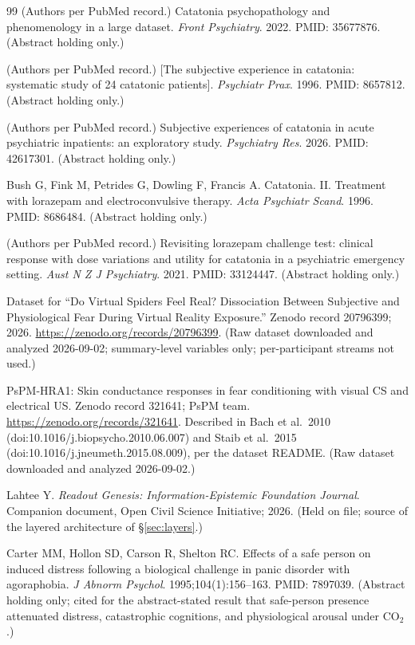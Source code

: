 \documentclass[9pt,twocolumn]{article}
\begin{document}
\begin{thebibliography}{99}
(Authors per PubMed record.) Catatonia psychopathology and phenomenology in a large dataset. \emph{Front Psychiatry}. 2022. PMID: 35677876. (Abstract holding only.)

(Authors per PubMed record.) [The subjective experience in catatonia: systematic study of 24 catatonic patients]. \emph{Psychiatr Prax}. 1996. PMID: 8657812. (Abstract holding only.)

(Authors per PubMed record.) Subjective experiences of catatonia in acute psychiatric inpatients: an exploratory study. \emph{Psychiatry Res}. 2026. PMID: 42617301. (Abstract holding only.)

Bush G, Fink M, Petrides G, Dowling F, Francis A. Catatonia. II. Treatment with lorazepam and electroconvulsive therapy. \emph{Acta Psychiatr Scand}. 1996. PMID: 8686484. (Abstract holding only.)

(Authors per PubMed record.) Revisiting lorazepam challenge test: clinical response with dose variations and utility for catatonia in a psychiatric emergency setting. \emph{Aust N Z J Psychiatry}. 2021. PMID: 33124447. (Abstract holding only.)

Dataset for ``Do Virtual Spiders Feel Real? Dissociation Between Subjective and Physiological Fear During Virtual Reality Exposure.'' Zenodo record 20796399; 2026. \url{https://zenodo.org/records/20796399}. (Raw dataset downloaded and analyzed 2026-09-02; summary-level variables only; per-participant streams not used.)

PsPM-HRA1: Skin conductance responses in fear conditioning with visual CS and electrical US. Zenodo record 321641; PsPM team. \url{https://zenodo.org/records/321641}. Described in Bach et al.\ 2010 (doi:10.1016/j.biopsycho.2010.06.007) and Staib et al.\ 2015 (doi:10.1016/j.jneumeth.2015.08.009), per the dataset README. (Raw dataset downloaded and analyzed 2026-09-02.)

Lahtee Y. \emph{Readout Genesis: Information-Epistemic Foundation Journal}. Companion document, Open Civil Science Initiative; 2026. (Held on file; source of the layered architecture of \S\ref{sec:layers}.)

Carter MM, Hollon SD, Carson R, Shelton RC. Effects of a safe person on induced distress following a biological challenge in panic disorder with agoraphobia. \emph{J Abnorm Psychol}. 1995;104(1):156--163. PMID: 7897039. (Abstract holding only; cited for the abstract-stated result that safe-person presence attenuated distress, catastrophic cognitions, and physiological arousal under CO$_2$.)


\end{thebibliography}
\end{document}
